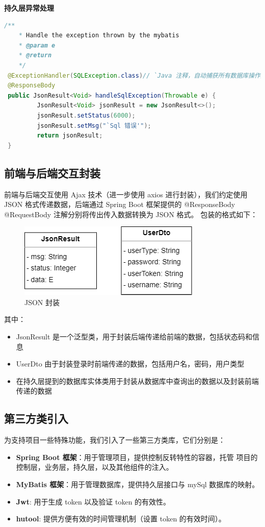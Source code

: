 \documentclass[12pt, a4paper]{article}
\begin{document}
\textbf{持久层异常处理}
\begin{lstlisting}[language=Java]
	/**
	* Handle the exception thrown by the mybatis
	* @param e
	* @return
	*/
 @ExceptionHandler(SQLException.class)// `Java 注释，自动捕获所有数据库操作异常'
 @ResponseBody
 public JsonResult<Void> handleSqlException(Throwable e) {
		 JsonResult<Void> jsonResult = new JsonResult<>();
		 jsonResult.setStatus(6000);
		 jsonResult.setMsg("`Sql 错误'");
		 return jsonResult;
 }
\end{lstlisting}


\subsection{前端与后端交互封装}
前端与后端交互使用 Ajax 技术（进一步使用 axios 进行封装），我们约定使用 JSON 格式传递数据，后端通过 Spring Boot
框架提供的 @ResponseBody @RequestBody 注解分别将传出传入数据转换为 JSON 格式。
包装的格式如下：
\begin{figure}[H]
	\centering
	\includegraphics[width = 0.4 \textwidth]{Json.png}
	\caption{JSON 封装}
\end{figure}
其中：
\begin{itemize}
	\item JsonResult 是一个泛型类，用于封装后端传递给前端的数据，包括状态码和信息
	\item UserDto 由于封装登录时前端传递的数据，包括用户名，密码，用户类型
	\item 在持久层提到的数据库实体类用于封装从数据库中查询出的数据以及封装前端传递的数据
\end{itemize}

\subsection{第三方类引入}
为支持项目一些特殊功能，我们引入了一些第三方类库，它们分别是：
\begin{itemize}
	\item \textbf{Spring Boot 框架}：用于管理项目，提供控制反转特性的容器，托管
	      项目的控制层，业务层，持久层，以及其他组件的注入。
	\item \textbf{MyBatis 框架}：用于管理数据库，提供持久层接口与 mySql 数据库的映射。
	\item \textbf{Jwt}: 用于生成 token 以及验证 token 的有效性。
	\item \textbf{hutool}: 提供方便有效的时间管理机制（设置 token 的有效时间）。

\end{itemize}
\end{document}
